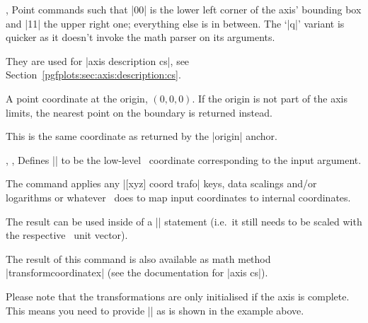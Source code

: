 \begin{commandlist}{%
	\pgfplotspointdescriptionxy{},%
	\pgfplotsqpointdescriptionxy{}}%
	Point commands such that |{0}{0}| is the lower left corner of the axis' bounding box and |{1}{1}| the upper right one; everything else is in between. The `|q|' variant is quicker as it doesn't invoke the math parser on its arguments.

	They are used for |axis description cs|, see Section~\ref{pgfplots:sec:axis:description:cs}.
\end{commandlist}

\begin{commandlist}{\pgfplotspointaxisorigin}
	A point coordinate at the origin, $(0,0,0)$. If the origin is not part of the axis limits, the nearest point on the boundary is returned instead.

	This is the same coordinate as returned by the |origin| anchor.
\end{commandlist}

\begin{commandlist}{%
	\pgfplotstransformcoordinatex{},%
	\pgfplotstransformcoordinatey{},%
	\pgfplotstransformcoordinatez{}}
	Defines |\pgfmathresult| to be the low-level \PGF\ coordinate corresponding to the input argument.

	The command applies any |[xyz] coord trafo| keys, data scalings and/or logarithms or whatever \PGFPlots\ does to map input coordinates to internal coordinates.

	The result can be used inside of a |\pgfpointxy| statement (i.e.\ it still needs to be scaled with the respective \PGF\ unit vector).
\begin{codeexample}[]
\end{codeexample}
	The result of this command is also available as math method |transformcoordinatex| (see the documentation for |axis cs|).

	Please note that the transformations are only initialised if the axis is complete. This means you need to provide |\pgfplotsextra| as is shown in the example above.
\end{commandlist}

